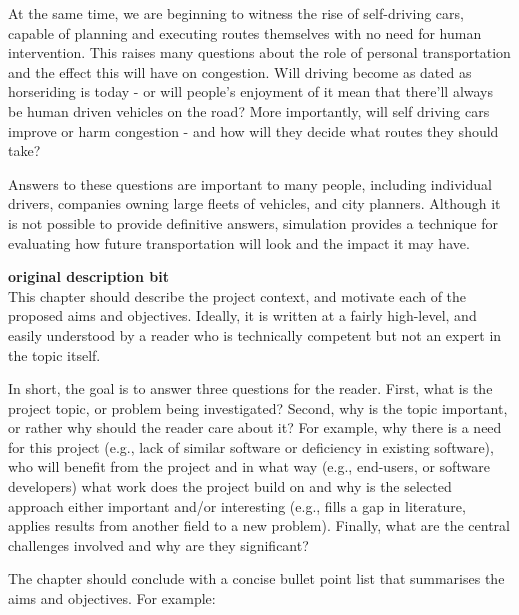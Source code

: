 \documentclass[ %
                    author={Alexander Hill},
                supervisor={Dr. Benjamin Sach},
                    degree={MEng},
                     title={MARMOSET: Multi Agent Routing for Managing Online Smart-cities for Efficient Transportation},
                  subtitle={},
                      type={research},
                      year={2016} ]{dissertation}
\begin{document}
At the same time, we are beginning to witness the rise of self-driving cars,
capable of planning and executing routes themselves with no need for human
intervention. This raises many questions about the role of personal
transportation and the effect this will have on congestion. Will driving become
as dated as horseriding is today - or will people's enjoyment of it mean that
there'll always be human driven vehicles on the road? More importantly, will
self driving cars improve or harm congestion - and how will they decide what
routes they should take?

Answers to these questions are important to many people, including individual
drivers, companies owning large fleets of vehicles, and city planners. Although
it is not possible to provide definitive answers, simulation provides a
technique for evaluating how future transportation will look and the impact it
may have.

\textbf{original description bit\\}
This chapter should describe the project context, and motivate each of
the proposed aims and objectives.  Ideally, it is written at a fairly
high-level, and easily understood by a reader who is technically
competent but not an expert in the topic itself.

In short, the goal is to answer three questions for the reader.  First,
what is the project topic, or problem being investigated?  Second, why
is the topic important, or rather why should the reader care about it?
For example, why there is a need for this project (e.g., lack of similar
software or deficiency in existing software), who will benefit from the
project and in what way (e.g., end-users, or software developers) what
work does the project build on and why is the selected approach either
important and/or interesting (e.g., fills a gap in literature, applies
results from another field to a new problem).  Finally, what are the
central challenges involved and why are they significant?

The chapter should conclude with a concise bullet point list that
summarises the aims and objectives.  For example:
\end{document}
